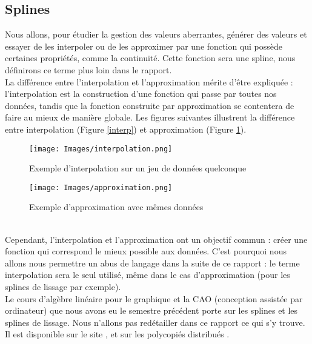 \documentclass[a4paper,12pt]{article} %
\begin{document}
		\subsection{Splines}
		    Nous allons, pour étudier la gestion des valeurs aberrantes, générer des valeurs et essayer de les interpoler ou de les approximer par une fonction qui possède certaines propriétés, comme la continuité. Cette fonction sera une spline, nous définirons ce terme plus loin dans le rapport.\\
		    
			 La différence entre l'interpolation et l'approximation mérite d'être expliquée : l'interpolation est la construction d'une fonction qui passe par toutes nos données, tandis que la fonction construite par approximation se contentera de faire au mieux de manière globale. Les figures suivantes illustrent la différence entre interpolation (Figure \ref{interp}) et approximation (Figure \ref{approx}).
			 
			  \begin{figure}[H]
                    \centering
                     \texttt{[image: Images/interpolation.png]}
                    \caption{\label{interp}Exemple d'interpolation sur un jeu de données quelconque}
                   \endminipage
                   \hfill
                    \endminipage
                     \texttt{[image: Images/approximation.png]}
                    \caption{\label{approx}Exemple d'approximation avec mêmes données}
                    \endminipage
                \end{figure}\\
			 
			 Cependant, l'interpolation et l'approximation ont un objectif commun : créer une fonction qui correspond le mieux possible aux données. C'est pourquoi nous allons nous permettre un abus de langage dans la suite de ce rapport : le terme interpolation sera le seul utilisé, même dans le cas d'approximation (pour les splines de lissage par exemple).\\
			 
			 Le cours d'algèbre linéaire pour le graphique et la CAO (conception assistée par ordinateur) que nous avons eu le semestre précédent porte sur les splines et les splines de lissage. Nous n'allons pas redétailler dans ce rapport ce qui s'y trouve. Il est disponible sur le site \cite{CAO_site}, et sur les polycopiés distribués \cite{CAO_lissage}.
			 
\end{document}
